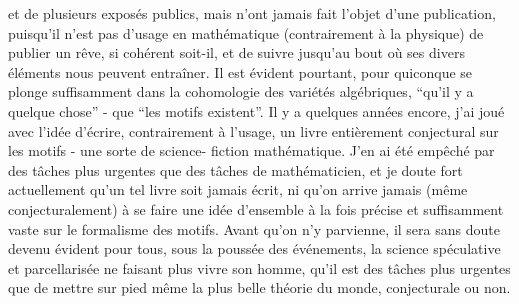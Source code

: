 
et de plusieurs exposés publics, mais n'ont jamais
fait l'objet d'une publication, puisqu'il n'est pas
d'usage en mathématique (contrairement à la physique)
de publier un rêve, si cohérent soit-il, et de suivre
jusqu'au bout où ses divers éléments nous peuvent entraîner.
Il est évident pourtant, pour quiconque se plonge
suffisamment dans la cohomologie des variétés algébriques,
``qu'il y a quelque chose'' - que ``les motifs existent''.
Il y a quelques années encore, j'ai joué avec l'idée
d'écrire, contrairement à l'usage, un livre entièrement
conjectural sur les motifs - une sorte de science-%
fiction mathématique. J'en ai été empêché par des
tâches plus urgentes que des tâches de mathématicien,
et je doute fort actuellement qu'un tel livre soit
jamais écrit, ni qu'on arrive jamais (même conjecturalement)
à se faire une idée d'ensemble à la fois précise et
suffisamment vaste sur le formalisme des motifs. Avant
qu'on n'y parvienne, il sera sans doute devenu évident
pour tous, sous la poussée des événements, la science
spéculative et parcellarisée ne faisant plus vivre son
homme, qu'il est des tâches plus urgentes que de mettre
sur pied même la plus belle théorie du monde, conjecturale
ou non.

